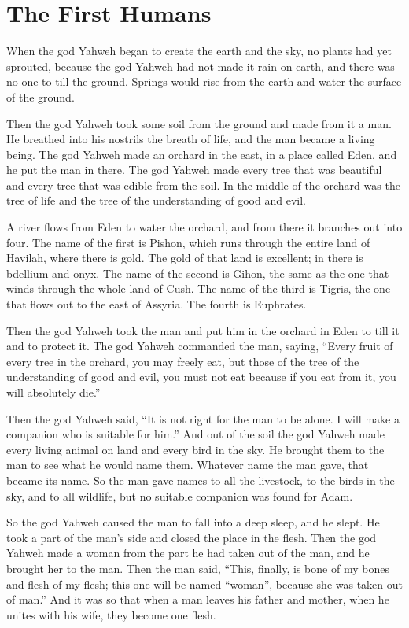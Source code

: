\chapter{The First Humans}

When the god Yahweh began to create the earth and the sky, no plants had yet 
sprouted, because the god Yahweh had not made it rain on earth, 
and there was no one to till the ground.  Springs would rise from the earth 
and water the surface of the ground.

Then the god Yahweh took some soil from the ground and made from it a man.  
He breathed into his nostrils the breath of life, and the man became 
a living being.  The god Yahweh made an orchard in the east, in a place called 
Eden, and he put the man in there.  The god Yahweh made every tree that was beautiful 
and every tree that was edible from the soil.  In the middle of the orchard was 
the tree of life and the tree of the understanding of good and evil.

A river flows from Eden to water the orchard, and from there it branches out 
into four.  The name of the first is Pishon, which runs through the entire land 
of Havilah, where there is gold.  The gold of that land is excellent; in there is 
bdellium and onyx.  The name of the second is Gihon, the same as the one that 
winds through the whole land of Cush.  The name of the third is Tigris, the one 
that flows out to the east of Assyria.  The fourth is Euphrates.

Then the god Yahweh took the man and put him in the orchard in Eden to till it 
and to protect it.  The god Yahweh commanded the man, saying, 
\enquote{Every fruit of every tree in the orchard, you may freely eat, but 
those of the tree of the understanding of good and evil, you must not eat 
because if you eat from it, you will absolutely die.}

Then the god Yahweh said, \enquote{It is not right for the man to be alone.  
I will make a companion who is suitable for him.} And out of the soil the god 
Yahweh made every living animal on land and every bird in the sky.  He brought 
them to the man to see what he would name them.  Whatever name the man gave, 
that became its name.  So the man gave names to all the livestock, to the birds 
in the sky, and to all wildlife, but no suitable companion was found for Adam.

So the god Yahweh caused the man to fall into a deep sleep, and he slept.  He 
took a part of the man's side and closed the place in the flesh.  Then the god 
Yahweh made a woman from the part he had taken out of the man, and he brought 
her to the man.  Then the man said, \enquote{This, finally, is bone of my bones 
and flesh of my flesh; this one will be named “woman”, because she was taken out 
of man.} And it was so that when a man leaves his father and mother, when he 
unites with his wife, they become one flesh.  

